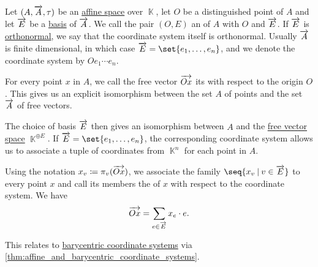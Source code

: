 \begin{definition}\label{def:affine_coordinate_system}
  Let \( (A, \overrightarrow{A}, \tau) \) be an \hyperref[def:affine_space]{affine space} over \( \BbbK \), let \( O \) be a distinguished point of \( A \) and let \( \overrightarrow{E} \) be a \hyperref[def:hamel_basis]{basis} of \( \overrightarrow{A} \). We call the pair \( (O, E) \) an  of \( A \) with  \( O \) and  \( \overrightarrow{E} \). If \( \overrightarrow{E} \) is \hyperref[def:orthogonality]{orthonormal}, we say that the coordinate system itself is orthonormal. Usually \( \overrightarrow{A} \) is finite dimensional, in which case \( \vect E = \set{ e_1, \ldots, e_n } \), and we denote the coordinate system by \( O e_1 \cdots e_n \).

  For every point \( x \) in \( A \), we call the free vector \( \overrightarrow{Ox} \) its  with respect to the origin \( O \). This gives us an explicit isomorphism between the set \( A \) of points and the set \( \overrightarrow{A} \) of free vectors.

  The choice of basis \( \overrightarrow{E} \) then gives an isomorphism between \( A \) and the \hyperref[def:free_semimodule]{free vector space} \( \BbbK^{\oplus E} \). If \( \vect E = \set{ e_1, \ldots, e_n } \), the corresponding coordinate system allows us to associate a tuple of coordinates from \( \BbbK^n \) for each point in \( A \).

  Using the notation \( x_v \coloneqq \pi_v(\overrightarrow{Ox}) \), we associate the family \( \seq{ x_v \given v \in \vect E } \) to every point \( x \) and call its members the  of \( x \) with respect to the coordinate system. We have
  \begin{equation}\label{eq:def:affine_coordinate_system/coordinates}
    \overrightarrow{Ox} = \sum_{e \in \overrightarrow{E}} x_e \cdot e.
  \end{equation}

  This relates to \hyperref[def:barycentric_coordinate_system]{barycentric coordinate systems} via \cref{thm:affine_and_barycentric_coordinate_systems}.
\end{definition}


